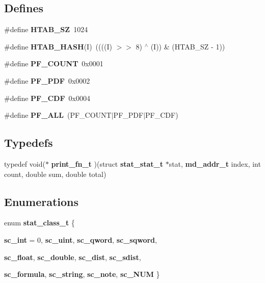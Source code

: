 \subsection*{Defines}
\begin{CompactItemize}
\item 
\#define {\bf HTAB\_\-SZ}~1024
\item 
\#define {\bf HTAB\_\-HASH}(I)~((((I) $>$$>$ 8) $^\wedge$ (I)) \& (HTAB\_\-SZ - 1))
\item 
\#define {\bf PF\_\-COUNT}~0x0001
\item 
\#define {\bf PF\_\-PDF}~0x0002
\item 
\#define {\bf PF\_\-CDF}~0x0004
\item 
\#define {\bf PF\_\-ALL}~(PF\_\-COUNT$|$PF\_\-PDF$|$PF\_\-CDF)
\end{CompactItemize}
\subsection*{Typedefs}
\begin{CompactItemize}
\item 
typedef void($\ast$ {\bf print\_\-fn\_\-t} )(struct {\bf stat\_\-stat\_\-t} $\ast$stat, {\bf md\_\-addr\_\-t} index, int count, double sum, double total)
\end{CompactItemize}
\subsection*{Enumerations}
\begin{CompactItemize}
\item 
enum {\bf stat\_\-class\_\-t} \{ \par
{\bf sc\_\-int} =  0, 
{\bf sc\_\-uint}, 
{\bf sc\_\-qword}, 
{\bf sc\_\-sqword}, 
\par
{\bf sc\_\-float}, 
{\bf sc\_\-double}, 
{\bf sc\_\-dist}, 
{\bf sc\_\-sdist}, 
\par
{\bf sc\_\-formula}, 
{\bf sc\_\-string}, 
{\bf sc\_\-note}, 
{\bf sc\_\-NUM}
 \}
\end{CompactItemize}
